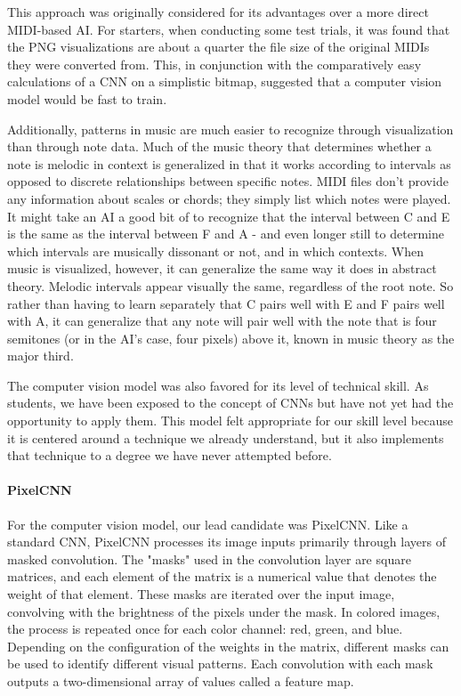 This approach was originally considered for its advantages over a more direct MIDI-based
AI. For starters, when conducting some test trials, it was found that the PNG
visualizations are about a quarter the file size of the original MIDIs they were converted
from. This, in conjunction with the comparatively easy calculations of a CNN on a
simplistic bitmap, suggested that a computer vision model would be fast to train.

Additionally, patterns in music are much easier to recognize through visualization than
through note data. Much of the music theory that determines whether a note is melodic in
context is generalized in that it works according to intervals as opposed to discrete
relationships between specific notes. MIDI files don't provide any information about
scales or chords; they simply list which notes were played. It might take an AI a good bit
of to recognize that the interval between C and E is the same as the interval between F
and A - and even longer still to determine which intervals are musically dissonant or not,
and in which contexts. When music is visualized, however, it can generalize the same way
it does in abstract theory. Melodic intervals appear visually the same, regardless of the
root note. So rather than having to learn separately that C pairs well with E and F pairs
well with A, it can generalize that any note will pair well with the note that is four
semitones (or in the AI's case, four pixels) above it, known in music theory as the major
third.

The computer vision model was also favored for its level of technical skill. As students,
we have been exposed to the concept of CNNs but have not yet had the opportunity to apply
them. This model felt appropriate for our skill level because it is centered around a
technique we already understand, but it also implements that technique to a degree we have
never attempted before.

\paragraph{PixelCNN}

For the computer vision model, our lead candidate was PixelCNN. Like a standard CNN,
PixelCNN processes its image inputs primarily through layers of masked convolution.
The "masks" used in the convolution layer are square matrices, and each element of the matrix
is a numerical value that denotes the weight of that element. These masks are iterated over the
input image, convolving with the brightness of the pixels under the mask. In colored images,
the process is repeated once for each color channel: red, green, and blue.\autocite{pixelCNN} Depending on the
configuration of the weights in the matrix, different masks can be used to identify different
visual patterns. Each convolution with each mask outputs a two-dimensional array of values
called a feature map.

